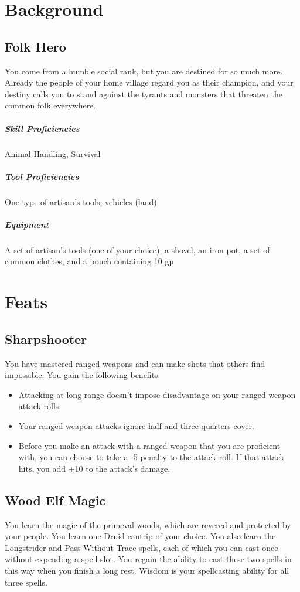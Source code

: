\documentclass[letterpaper,openany,oneside,twocolumn]{book}
\begin{document}
\section*{Background}
\subsection*{Folk Hero}
You come from a humble social rank, but you are destined for so much more. Already the people of your home village regard you as their champion, and your destiny calls you to stand against the tyrants and monsters that threaten the common folk everywhere.

\subparagraph*{Skill Proficiencies} Animal Handling, Survival
\subparagraph*{Tool Proficiencies} One type of artisan's tools, vehicles (land)
\subparagraph*{Equipment} A set of artisan's tools (one of your choice), a shovel, an iron pot, a set of common clothes, and a pouch containing 10 gp

\section*{Feats}
\subsection*{Sharpshooter}
You have mastered ranged weapons and can make shots that others find impossible. You gain the following benefits:
\begin{itemize}
  \item Attacking at long range doesn't impose disadvantage on your ranged weapon attack rolls.
  \item Your ranged weapon attacks ignore half and three-quarters cover.
  \item Before you make an attack with a ranged weapon that you are proficient with, you can choose to take a -5 penalty to the attack roll. If that attack hits, you add +10 to the attack's damage.
\end{itemize}

\subsection*{Wood Elf Magic}
You learn the magic of the primeval woods, which are revered and protected by your people. You learn one Druid cantrip of your choice. You also learn the Longstrider and Pass Without Trace spells, each of which you can cast once without expending a spell slot. You regain the ability to cast these two spells in this way when you finish a long rest. Wisdom is your spellcasting ability for all three spells.
\end{document}
